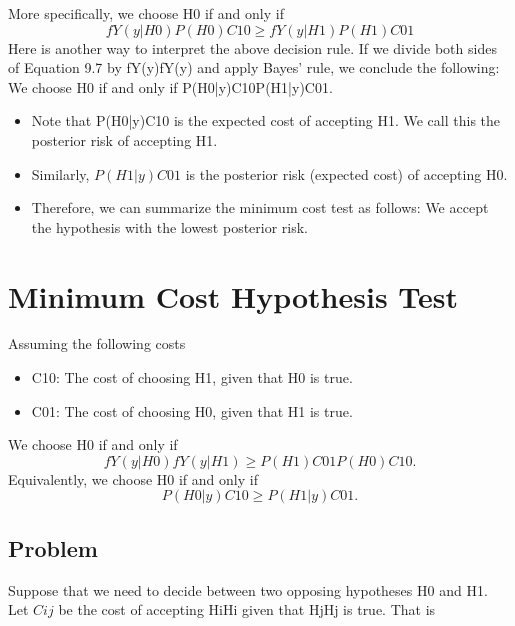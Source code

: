 \documentclass[]{report}
\begin{document}
More specifically, we choose H0 if and only if
\[fY(y|H0)P(H0)C10\geq fY(y|H1)P(H1)C01\]
Here is another way to interpret the above decision rule. If we divide both sides of Equation 9.7 by fY(y)fY(y) and apply Bayes' rule, we conclude the following: We choose H0 if and only if
P(H0|y)C10\geq P(H1|y)C01.
\begin{itemize}
    \item Note that P(H0|y)C10 is the expected cost of accepting H1. We call this the posterior risk of accepting H1. 
    \item Similarly, $P(H1|y)C01$ is the posterior risk (expected cost) of accepting H0. 
    \item Therefore, we can summarize the minimum cost test as follows: We accept the hypothesis with the lowest posterior risk.
\end{itemize}

\section{Minimum Cost Hypothesis Test}

Assuming the following costs 

\begin{itemize}
    \item C10: The cost of choosing H1, given that H0 is true.
\item C01: The cost of choosing H0, given that H1 is true.
\end{itemize}

We choose H0 if and only if
\[fY(y|H0)fY(y|H1)\geq P(H1)C01P(H0)C10.\]
Equivalently, we choose H0 if and only if
\[P(H0|y)C10\geq P(H1|y)C01.\]



\subsection{Problem}
Suppose that we need to decide between two opposing hypotheses H0 and H1. Let $Cij$ be the cost of accepting HiHi given that HjHj is true. That is 
\end{document}

